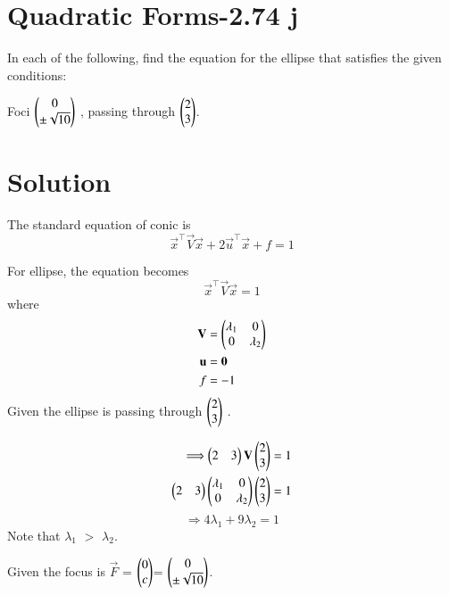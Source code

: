 \documentclass[journal,12pt,twocolumn]{IEEEtran}
\begin{document}
\section{Quadratic Forms-2.74 j}
In each of the following, find the equation for
the ellipse that satisfies the given conditions:

Foci $\begin{pmatrix}0 \\ \pm \sqrt{10}\end{pmatrix}$ , passing through $\begin{pmatrix}2\\3\end{pmatrix}$.

\section{Solution}
The standard equation of conic is
\begin{equation}
    \vec{x}^{\top}\vec{V}\vec{x}+2\vec{u}^{\top}\vec{x}+f = 1
\end{equation}

For ellipse, the equation becomes
\begin{equation}
    \vec{x}^{\top}\vec{V}\vec{x} = 1
\end{equation}
where
\begin{align}
    \mathbf{V} &= \begin{pmatrix}\lambda_1 & 0 \\ 0 & \lambda_2\end{pmatrix}\\
    \mathbf{u} &= \mathbf{0}\\
    f &= -1
\end{align}
Given the ellipse is passing through $\begin{pmatrix}2\\3\end{pmatrix}$ .

\begin{align}
   \Longrightarrow  \begin{pmatrix}2&3\end{pmatrix}\mathbf{V} \begin{pmatrix}2\\3\end{pmatrix}& = 1\\
     \begin{pmatrix}2&3\end{pmatrix}\begin{pmatrix}\lambda_1&0\\0&\lambda_2\end{pmatrix} \begin{pmatrix}2\\3\end{pmatrix}& = 1
\end{align}
\begin{equation}
     \Longrightarrow 4\lambda_1 +9\lambda_2=1 \label{eq:5}
\end{equation}
Note that $\lambda_1$ $>$ $\lambda_2$.

Given the focus is $\vec{F}$ = $\begin{pmatrix}0 \\ c\end{pmatrix}$= $\begin{pmatrix}0 \\ \pm \sqrt{10}\end{pmatrix}$.
\end{document}
